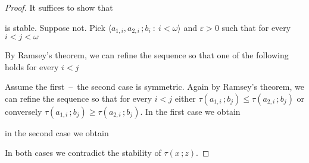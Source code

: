 \begin{proof}
  It suffices to show that


  is stable.
  Suppose not.
  Pick $\langle a_{1,i},a_{2,i}\,;b_i\ :\ i<\omega\rangle$ and $\varepsilon>0$  such that for every $i<j<\omega$


  By Ramsey's theorem, we can refine the sequence so that one of the following holds for every $i<j$

  

Assume the first~--~the second case is symmetric.
Again by Ramsey's theorem, we can refine the sequence so that for every $i<j$ either  $\tau(a_{1,i}\,;b_j)\le\tau(a_{2,i}\,;b_j)$ or conversely $\tau(a_{1,i}\,;b_j)\ge\tau(a_{2,i}\,;b_j)$.
In the first case we obtain


in the second case we obtain


In both cases we contradict the stability of $\tau(x\,;z)$.
\end{proof}



